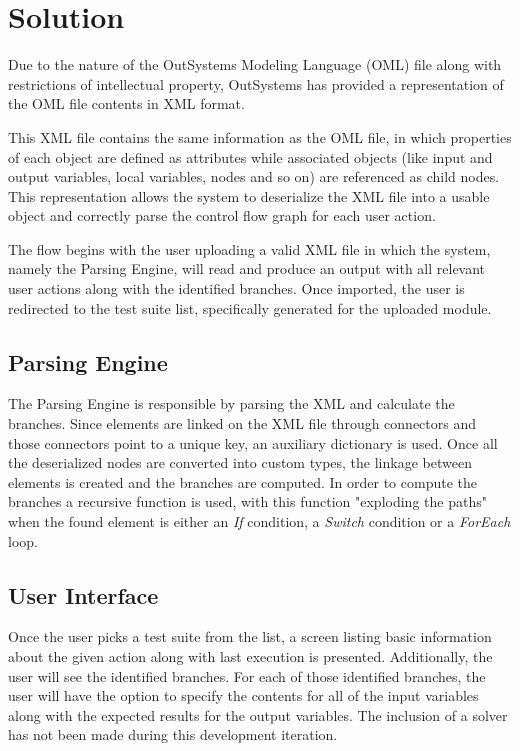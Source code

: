\documentclass{sigchi}
\begin{document}
\section{Solution}
Due to the nature of the OutSystems Modeling Language (OML) file along with restrictions of intellectual property, OutSystems has provided a representation of the OML file contents in XML format.

This XML file contains the same information as the OML file, in which properties of each object are defined as attributes while associated objects (like input and output variables, local variables, nodes and so on) are referenced as child nodes. This representation allows the system to deserialize the XML file into a usable object and correctly parse the control flow graph for each user action.

The flow begins with the user uploading a valid XML file in which the system, namely the Parsing Engine, will read and produce an output with all relevant user actions along with the identified branches. Once imported, the user is redirected to the test suite list, specifically generated for the uploaded module.

\subsection{Parsing Engine}
The Parsing Engine is responsible by parsing the XML and calculate the branches. Since elements are linked on the XML file through connectors and those connectors point to a unique key, an auxiliary dictionary is used. Once all the deserialized nodes are converted into custom types, the linkage between elements is created and the branches are computed. In order to compute the branches a recursive function is used, with this function "exploding the paths" when the found element is either an \textit{If} condition, a \textit{Switch} condition or a \textit{ForEach} loop.

\subsection{User Interface}
Once the user picks a test suite from the list, a screen listing basic information about the given action along with last execution is presented. Additionally, the user will see the identified branches. For each of those identified branches, the user will have the option to specify the contents for all of the input variables along with the expected results for the output variables. The inclusion of a solver has not been made during this development iteration.
\end{document}
